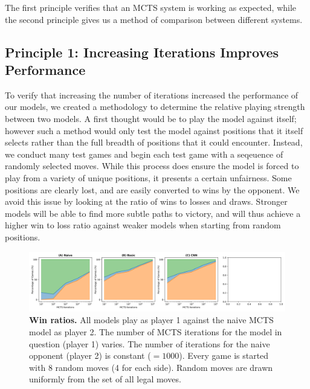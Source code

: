 \documentclass[10pt]{article}
\begin{document}
The first principle verifies that an MCTS system is working as expected, while the second principle gives us a method of comparison between different systems.

\subsection{Principle 1: Increasing Iterations Improves Performance}
\label{sec:moreitersisbetter}

To verify that increasing the number of iterations increased the performance of our models, we created a methodology to determine the relative playing strength between two models. A first thought would be to play the model against itself; however such a method would only test the model against positions that it itself selects rather than the full breadth of positions that it could encounter. Instead, we conduct many test games and begin each test game with a seqeuence of randomly selected moves. While this process does ensure the model is forced to play from a variety of unique positions, it presents a certain unfairness. Some positions are clearly lost, and are easily converted to wins by the opponent. We avoid this issue by looking at the ratio of wins to losses and draws. Stronger models will be able to find more subtle paths to victory, and will thus achieve a higher win to loss ratio against weaker models when starting from random positions.

\begin{figure}[H]
    \centering
    \includegraphics[width=\linewidth]{win_rates.png}
    \caption{\textbf{Win ratios.} All models play as player 1 against the naive MCTS model as player 2. The number of MCTS iterations for the model in question (player 1) varies. The number of iterations for the naive opponent (player 2) is constant ($= 1000$). Every game is started with 8 random moves (4 for each side). Random moves are drawn uniformly from the set of all legal moves.}
    \label{fig:selfplay}
\end{figure}
\end{document}
